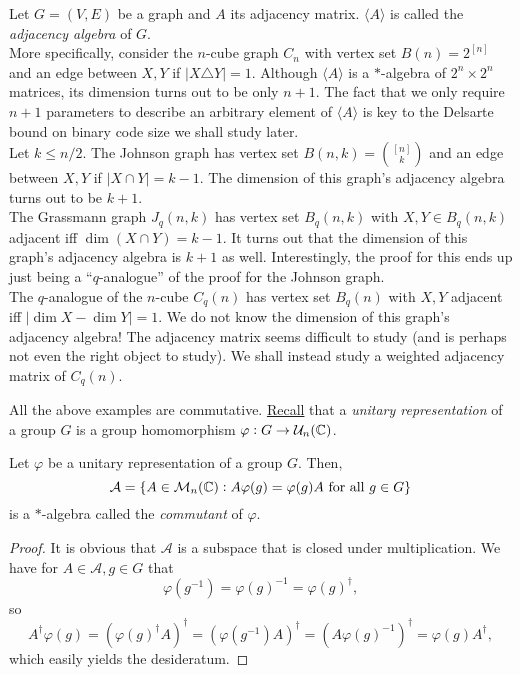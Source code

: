 	\begin{fex}
		\label{exmp: star-alg}
		Let $G = (V,E)$ be a graph and $A$ its adjacency matrix. $\langle A\rangle$ is called the \emph{adjacency algebra} of $G$. \\

		More specifically, consider the $n$-cube graph $C_n$ with vertex set $B(n)=2^{[n]}$ and an edge between $X,Y$ if $|X \triangle Y| = 1$. Although $\langle A\rangle$ is a $*$-algebra of $2^n \times 2^n$ matrices, its dimension turns out to be only $n+1$. The fact that we only require $n+1$ parameters to describe an arbitrary element of $\langle A\rangle$ is key to the Delsarte bound on binary code size we shall study later.\\

		Let $k \le n/2$. The Johnson graph has vertex set $B(n,k) = \binom{[n]}{k}$ and an edge between $X,Y$ if $|X \cap Y| = k-1$. The dimension of this graph's adjacency algebra turns out to be $k+1$.\\

		The Grassmann graph $J_q(n,k)$ has vertex set $B_q(n,k)$ with $X,Y \in B_q(n,k)$ adjacent iff $\dim(X \cap Y) = k-1$. It turns out that the dimension of this graph's adjacency algebra is $k+1$ as well. Interestingly, the proof for this ends up just being a ``$q$-analogue'' of the proof for the Johnson graph.\\

		The $q$-analogue of the $n$-cube $C_q(n)$ has vertex set $B_q(n)$ with $X,Y$ adjacent iff $|\dim X - \dim Y| = 1$. We do not know the dimension of this graph's adjacency algebra! The adjacency matrix seems difficult to study (and is perhaps not even the right object to study). We shall instead study a weighted adjacency matrix of $C_q(n)$.
	\end{fex}

	All the above examples are commutative. \href{https://amitrajaraman.github.io/notes/rep-th/main.pdf}{Recall} that a \emph{unitary representation} of a group $G$ is a group homomorphism $\varphi : G \to \mathcal{U}_n(\mathbb{C})$.

	\begin{ftheo}
		Let $\varphi$ be a unitary representation of a group $G$. Then,
		\[ \mathcal{A} = \{A \in \mathcal{M}_n(\mathbb{C}) : A \varphi(g) = \varphi(g) A \text{ for all } g \in G \} \]
		is a $*$-algebra called the \emph{commutant} of $\varphi$.
	\end{ftheo}
	\begin{proof}
		It is obvious that $\mathcal{A}$ is a subspace that is closed under multiplication. We have for $A \in \mathcal{A}, g \in G$ that
		\[ \varphi(g^{-1}) = \varphi(g)^{-1} = \varphi(g)^\dagger, \]
		so
		\[ A^\dagger \varphi(g) = (\varphi(g)^\dagger A)^\dagger = (\varphi(g^{-1}) A)^\dagger = (A \varphi(g)^{-1})^\dagger = \varphi(g) A^\dagger, \]
		which easily yields the desideratum.
	\end{proof}

